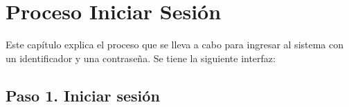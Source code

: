 \chapter{Proceso Iniciar Sesión}
	Este capítulo explica el proceso que se lleva a cabo para ingresar al 
	sistema con un identificador y una contraseña. 
	Se tiene la siguiente interfaz:
	


\section{Paso 1. Iniciar sesión}
	
